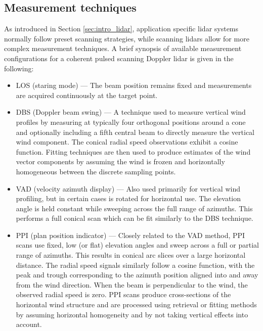\subsection{Measurement techniques}
\label{sec:intro_meas_tech}

As introduced in Section \ref{sec:intro_lidar}, application specific lidar systems normally follow preset scanning strategies, while scanning lidars allow for more complex measurement techniques. A brief synopsis of available measurement configurations for a coherent pulsed scanning Doppler lidar is given in the following: 

\begin{itemize}
\item LOS (staring mode) --- The beam position remains fixed and measurements are acquired continuously at the target point.

\item DBS (Doppler beam swing) --- A technique used to measure vertical wind profiles by measuring at typically four orthogonal positions around a cone and optionally including a fifth central beam to directly measure the vertical wind component. The conical radial speed observations exhibit a cosine function. Fitting techniques are then used to produce estimates of the wind vector components by assuming the wind is frozen and horizontally homogeneous between the discrete sampling points.

\item VAD (velocity azimuth display) --- Also used primarily for vertical wind profiling, but in certain cases is rotated for horizontal use. The elevation angle is held constant while sweeping across the full range of azimuths. This performs a full conical scan which can be fit similarly to the DBS technique.

\item PPI (plan position indicator) --- Closely related to the VAD method, PPI scans use fixed, low (or flat) elevation angles and sweep across a full or partial range of azimuths. This results in conical arc slices over a large horizontal distance. The radial speed signals similarly follow a cosine function, with the peak and trough corresponding to the azimuth position aligned into and away from the wind direction. When the beam is perpendicular to the wind, the observed radial speed is zero. PPI scans produce cross-sections of the horizontal wind structure and are processed using retrieval or fitting methods by assuming horizontal homogeneity and by not taking vertical effects into account.


\end{itemize}
